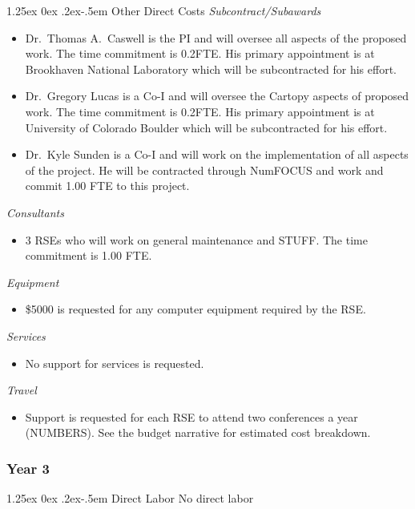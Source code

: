 \documentclass[12pt]{article}
\makeatletter
\numberwithin{page}{section}
\renewcommand{\paragraph}{%
  \@startsection{paragraph}{4}%
  {\z@}{1.25ex \@plus 0ex \@minus .2ex}{-.5em}%
  {\normalfont\normalsize\itshape\bfseries}%
}
\makeatother
\begin{document}
\paragraph{Other Direct Costs}
\textit{Subcontract/Subawards}
\begin{itemize}
  \item Dr.\ Thomas A.\ Caswell is the PI and will oversee all aspects of the
  proposed work.  The time commitment is 0.2FTE.  His primary
  appointment is at Brookhaven National Laboratory which will be
  subcontracted for his effort.
\item Dr.\ Gregory Lucas is a Co-I and will oversee the Cartopy aspects of
  proposed work.  The time commitment is 0.2FTE.  His primary appointment is at
  University of Colorado Boulder which will be subcontracted for his effort.
\item Dr.\ Kyle Sunden is a Co-I and will work on the implementation of all
  aspects of the project.  He will be contracted through NumFOCUS and work and
  commit 1.00 FTE to this project.
\end{itemize}
\textit{Consultants}
\begin{itemize}
\item 3 RSEs who will work on general maintenance and STUFF.  The time commitment is 1.00
  FTE.
\end{itemize}
\textit{Equipment}
\begin{itemize}
\item \$5000 is requested for any computer equipment required by the RSE.
\end{itemize}
\textit{Services}
\begin{itemize}
\item No support for services is requested.
\end{itemize}
\textit{Travel}
\begin{itemize}
\item Support is requested for each RSE to attend two conferences a
  year (NUMBERS).  See the budget narrative for estimated cost
  breakdown.
\end{itemize}
\subsubsection{Year 3}
\paragraph{Direct Labor}
No direct labor
\end{document}

